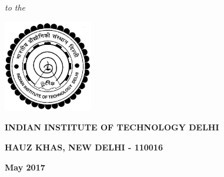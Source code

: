 \newpage
\thispagestyle{empty}
\begin{center}



\bigskip
\bigskip
\bigskip
\bigskip
\bigskip
\bigskip
\textbf
\bigskip
\bigskip

\textbf

\bigskip
\bigskip

\textbf

\bigskip
\bigskip
\bigskip
\bigskip
\bigskip
\bigskip


\textit

\textit

\bigskip
\bigskip

\textbf

\bigskip
\bigskip

\textit{to the}

\bigskip
\bigskip
\bigskip
\bigskip
\bigskip
\bigskip
\bigskip

\includegraphics[height=4cm]{Misc_front/iitlogo.eps}

\bigskip
\bigskip



\textbf{INDIAN INSTITUTE OF TECHNOLOGY DELHI}

\textbf{HAUZ KHAS, NEW DELHI - 110016}

\textbf{May 2017}
\end{center}
\mbox{}
\restoregeometry